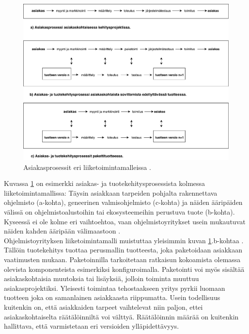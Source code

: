 \documentclass[finnish,12pt,a4paper,pdftex]{article}
\begin{document}
\begin{figure}[!h]
    \centering
    \includegraphics[scale=0.45]{asiakasprosessi.pdf}
    \caption{Asiakasprosessit eri liiketoimintamalleissa \citep{ohjelmistotuotanto}.}
    \label{fig:asiakasprosessi}
\end{figure}

Kuvassa \ref{fig:asiakasprosessi} on esimerkki asiakas- ja tuotekehitysprosessista kolmessa liiketoimintamallissa: Täysin asiakkaan tarpeiden pohjalta rakennettava ohjelmisto (a-kohta), geneerinen valmisohjelmisto (c-kohta) ja näiden ääripäiden välissä on ohjelmistoalustoihin tai ekosysteemeihin perustuva tuote (b-kohta). Kyseessä ei ole kolme eri vaihtoehtoa, vaan ohjelmistoyritykset usein mukautuvat näiden kahden ääripään välimaastoon \citep{okaytannot}.\\

\noindent Ohjelmistoyrityksen liiketoimintamalli muistuttaa yleisimmin kuvan \ref{fig:asiakasprosessi}.b-kohtaa \citep{ohjelmistotuotanto}. Tällöin tuotekehitys tuottaa perusmallin tuotteesta, joka paketoidaan asiakkaan vaatimusten mukaan. Paketoinnilla tarkoitetaan ratkaisun kokoamista olemassa olevista komponenteista esimerkiksi konfiguroimalla. Paketointi voi myös sisältää asiakaskohtaisia muutoksia tai lisäyksiä, jolloin toiminta muuttuu asiakasprojektiksi. Yleisesti toimintaa tehostaakseen yritys pyrkii luomaan tuotteen joka on samanlainen asiakkaasta riippumatta. Usein todellisuus kuitenkin on, että asiakkaiden tarpeet vaihtelevat niin paljon, ettei asiakaskohtaiselta räätälöinniltä voi välttyä. Räätälöinnin määrää on kuitenkin hallittava, että varmistetaan eri versioiden ylläpidettävyys. \citep{okaytannot}\\
\end{document}
